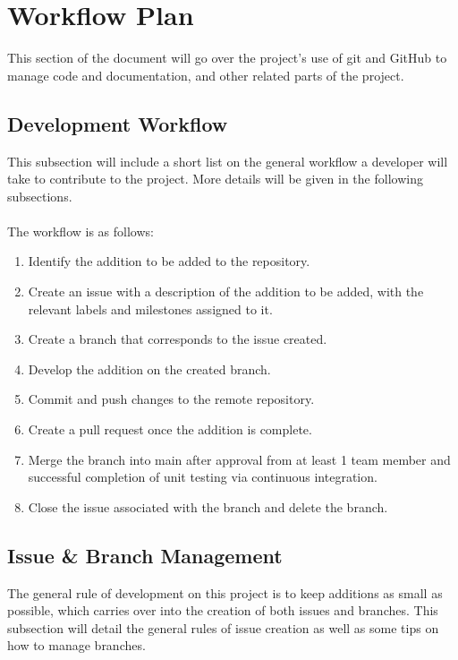 \documentclass{article}
\begin{document}
\section{Workflow Plan}

This section of the document will go over the project's use of git and GitHub to manage code and documentation, and other related parts of the project.

\subsection{Development Workflow}
This subsection will include a short list on the general workflow a developer will take to contribute to the project. More details will be given in the following subsections.
\\\\
The workflow is as follows:

\begin{enumerate}
    \item Identify the addition to be added to the repository.
    \item Create an issue with a description of the addition to be added, with the relevant labels and milestones assigned to it.
    \item Create a branch that corresponds to the issue created.
    \item Develop the addition on the created branch.
    \item Commit and push changes to the remote repository.
    \item Create a pull request once the addition is complete.
    \item Merge the branch into main after approval from at least 1 team member and successful completion of unit testing via continuous integration.
    \item Close the issue associated with the branch and delete the branch.
\end{enumerate}

\subsection{Issue \& Branch Management}
\label{sec:issuem}

The general rule of development on this project is to keep additions as small as possible, which carries over into the creation of both issues and branches. This subsection will detail the general rules of issue creation as well as some tips on how to manage branches.
\end{document}
